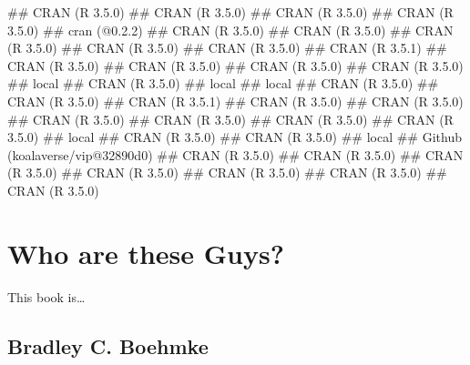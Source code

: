 \documentclass[]{book}
\newenvironment{Shaded}{\begin{snugshade}}{\end{snugshade}}
\newcommand{\NormalTok}[1]{#1}
\theoremstyle{definition}
\theoremstyle{definition}
\theoremstyle{definition}
\theoremstyle{remark}
\begin{document}
\begin{Shaded}
\begin{Highlighting}[]
\NormalTok{##  CRAN (R 3.5.0)                   }
\NormalTok{##  CRAN (R 3.5.0)                   }
\NormalTok{##  CRAN (R 3.5.0)                   }
\NormalTok{##  CRAN (R 3.5.0)                   }
\NormalTok{##  cran (@0.2.2)                    }
\NormalTok{##  CRAN (R 3.5.0)                   }
\NormalTok{##  CRAN (R 3.5.0)                   }
\NormalTok{##  CRAN (R 3.5.0)                   }
\NormalTok{##  CRAN (R 3.5.0)                   }
\NormalTok{##  CRAN (R 3.5.0)                   }
\NormalTok{##  CRAN (R 3.5.1)                   }
\NormalTok{##  CRAN (R 3.5.0)                   }
\NormalTok{##  CRAN (R 3.5.0)                   }
\NormalTok{##  CRAN (R 3.5.0)                   }
\NormalTok{##  CRAN (R 3.5.0)                   }
\NormalTok{##  local                            }
\NormalTok{##  CRAN (R 3.5.0)                   }
\NormalTok{##  local                            }
\NormalTok{##  local                            }
\NormalTok{##  CRAN (R 3.5.0)                   }
\NormalTok{##  CRAN (R 3.5.0)                   }
\NormalTok{##  CRAN (R 3.5.1)                   }
\NormalTok{##  CRAN (R 3.5.0)                   }
\NormalTok{##  CRAN (R 3.5.0)                   }
\NormalTok{##  CRAN (R 3.5.0)                   }
\NormalTok{##  CRAN (R 3.5.0)                   }
\NormalTok{##  CRAN (R 3.5.0)                   }
\NormalTok{##  CRAN (R 3.5.0)                   }
\NormalTok{##  local                            }
\NormalTok{##  CRAN (R 3.5.0)                   }
\NormalTok{##  CRAN (R 3.5.0)                   }
\NormalTok{##  local                            }
\NormalTok{##  Github (koalaverse/vip@32890d0)  }
\NormalTok{##  CRAN (R 3.5.0)                   }
\NormalTok{##  CRAN (R 3.5.0)                   }
\NormalTok{##  CRAN (R 3.5.0)                   }
\NormalTok{##  CRAN (R 3.5.0)                   }
\NormalTok{##  CRAN (R 3.5.0)                   }
\NormalTok{##  CRAN (R 3.5.0)                   }
\NormalTok{##  CRAN (R 3.5.0)}
\end{Highlighting}
\end{Shaded}

\hypertarget{author}{%
\chapter*{Who are these Guys?}\label{author}}

This book is\ldots{}

\hypertarget{bradley-c.-boehmke}{%
\section*{Bradley C. Boehmke}\label{bradley-c.-boehmke}}
\end{document}
